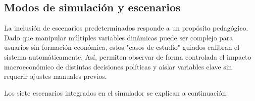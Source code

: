\documentclass[12pt, a4paper]{article}
\begin{document}
\subsection{Modos de simulación y escenarios}

La inclusión de escenarios predeterminados responde a un propósito pedagógico. Dado que manipular múltiples variables dinámicas puede ser complejo para usuarios sin formación económica, estos "casos de estudio" guiados calibran el sistema automáticamente. Así, permiten observar de forma controlada el impacto macroeconómico de distintas decisiones políticas y aislar variables clave sin requerir ajustes manuales previos.

Los siete escenarios integrados en el simulador se explican a continuación:
\end{document}
